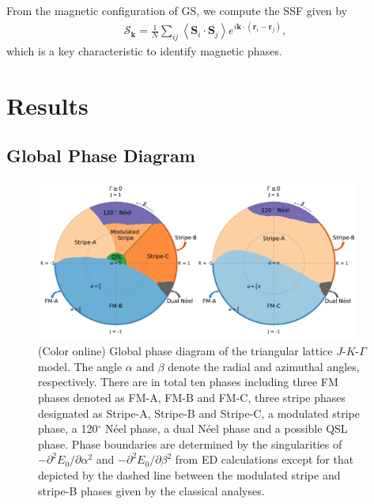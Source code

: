 \documentclass[aps,prb,reprint,amsfonts,amsmath,amssymb,showpacs,groupedaddress,superscriptaddress]{revtex4-1}
\begin{document}
From the magnetic configuration of GS, we compute the SSF given by
\begin{align}
    \mathcal{S}_{\bm{k}} = \frac{1}{N} \sum_{ij} \left \langle \bm{S}_i \cdot \bm{S}_j \right \rangle e^{i \bm{k} \cdot (\bm{r}_i-\bm{r}_j)},
\end{align}
which is a key characteristic to identify magnetic phases.

\section{\label{sec:Results}Results}

\subsection{\label{subsec:GlobalPhaseDiagram}Global Phase Diagram}

\begin{figure}
    \centering
    \includegraphics[width=0.95\textwidth]{fig/QuantumGlobalPhaseDiagram.pdf}
    \caption{\label{fig:QuantumPhaseDiagram}(Color online) Global phase diagram of the triangular lattice $J$-$K$-$\Gamma$ model. The angle $\alpha$ and $\beta$ denote the radial and azimuthal angles, respectively. There are in total ten phases including three FM phases denoted as FM-A, FM-B and FM-C, three stripe phases designated as Stripe-A, Stripe-B and Stripe-C, a modulated stripe phase, a 120$^\circ$ N\'{e}el phase, a dual N\'{e}el phase and a possible QSL phase. Phase boundaries are determined by the singularities of $-\partial^2E_0/\partial\alpha^2$ and $-\partial^2E_0/\partial\beta^2$ from ED calculations except for that depicted by the dashed line between the modulated stripe and stripe-B phases given by the classical analyses.}
\end{figure}
\end{document}
